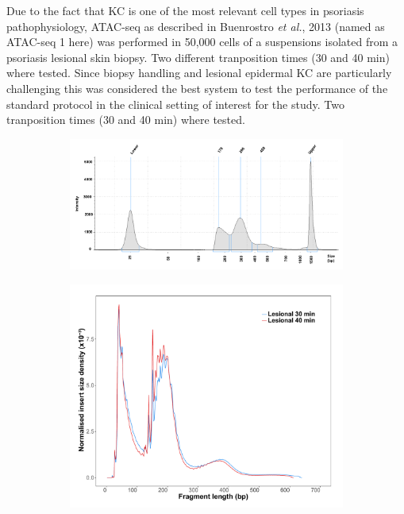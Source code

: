 Due to the fact that KC is one of the most relevant cell types in psoriasis pathophysiology, ATAC-seq as described in Buenrostro \textit{et al.}, 2013 (named as ATAC-seq 1 here) was performed in 50,000 cells of a suspensions isolated from a psoriasis lesional skin biopsy. Two different tranposition times (30 and 40 min) where tested. Since biopsy handling and lesional epidermal KC are particularly challenging this was considered the best system to test the performance of the standard protocol in the clinical setting of interest for the study. Two tranposition times (30 and 40 min) where tested.


\begin{figure}[htbp]
\centering
\begin{subfigure}{0.65\textwidth}
\centering
\includegraphics[width=\textwidth]{./Results1/pdfs/ATAC_PS02_tapestation_30min}
\caption{\textbf{}}
\end{subfigure}
\begin{subfigure}{0.45\textwidth}
\centering
\includegraphics[width=\textwidth]{./Results1/pdfs/ATAC_PS-2_30_40_min_fragment_size_distribution}

\end{subfigure}
\end{figure}
